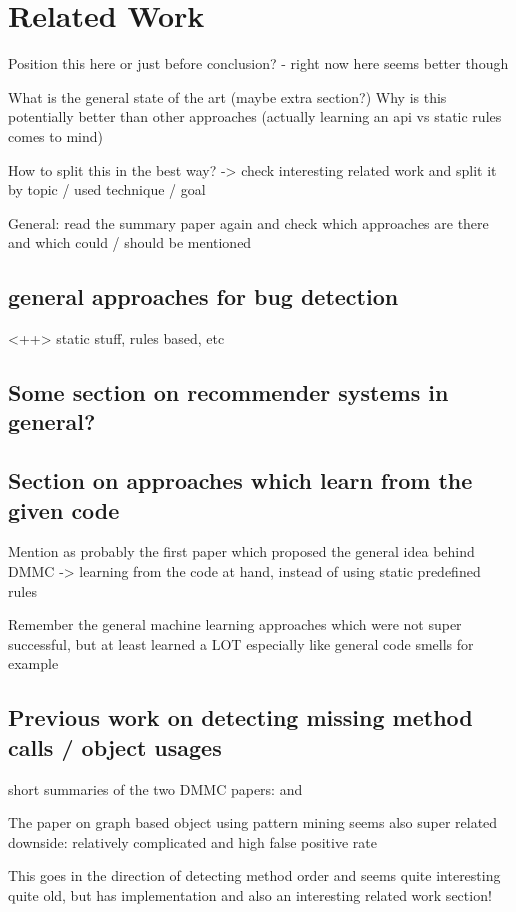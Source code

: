 \chapter{Related Work}
Position this here or just before conclusion? - right now here seems better though

What is the general state of the art (maybe extra section?)
Why is this potentially better than other approaches (actually learning an api vs static rules comes to mind)

How to split this in the best way?
-> check interesting related work and split it by topic / used technique / goal

General: read the summary paper \cite{robillard2013automated} again and check which approaches are there and which could / should be mentioned

\section{general approaches for bug detection}<++>
static stuff, rules based, etc

\section{Some section on recommender systems in general?}

\section{Section on approaches which learn from the given code}
Mention \cite{engler2001bugs} as probably the first paper which proposed the general idea behind DMMC -> learning from the code at hand, instead of using static predefined rules

Remember the general machine learning approaches which were not super successful, but at least learned a LOT
especially like general code smells for example

\section{Previous work on detecting missing method calls / object usages}
short summaries of the two DMMC papers: \cite{monperrus2010detecting} and \cite{monperrus2013detecting}

The paper on graph based object using pattern mining seems also super related \cite{nguyen2009graph}
downside: relatively complicated and high false positive rate

This \cite{wasylkowski2007detecting} goes in the direction of detecting method order and seems quite interesting
quite old, but has implementation and also an interesting related work section!
